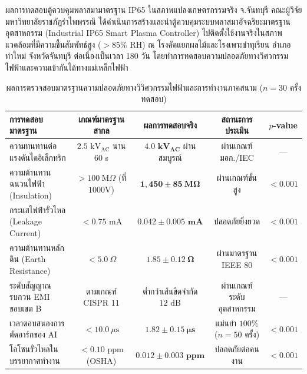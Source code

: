 \begin{agribox}{ผลการทดสอบตู้ควบคุมพลาสมามาตรฐาน IP65 ในสภาพแปลงเกษตรกรรมจริง จ.จันทบุรี}
คณะผู้วิจัย มหาวิทยาลัยราชภัฏรำไพพรรณี ได้ดำเนินการสร้างและนำตู้ควบคุมระบบพลาสมาอัจฉริยะมาตรฐานอุตสาหกรรม (Industrial IP65 Smart Plasma Controller) ไปติดตั้งใช้งานจริงในสภาพแวดล้อมที่มีความชื้นสัมพัทธ์สูง ($> 85\% \text{ RH}$) ณ โรงคัดแยกผลไม้และโรงเพาะชำทุเรียน อำเภอท่าใหม่ จังหวัดจันทบุรี ต่อเนื่องเป็นเวลา 180 วัน โดยทำการทดสอบความปลอดภัยทางวิศวกรรมไฟฟ้าและความเข้ากันได้ทางแม่เหล็กไฟฟ้า

\begin{table}[H]
\centering
\small
\caption{ผลการตรวจสอบมาตรฐานความปลอดภัยทางวิวิศวกรรมไฟฟ้าและการทำงานภาคสนาม ($n = 30$ ครั้งทดสอบ)}
\label{tab:ch10_electrical_safety}
\begin{tabular}{lcccc}
\toprule
\textbf{การทดสอบมาตรฐาน} & \textbf{เกณฑ์มาตรฐานสากล} & \textbf{ผลการทดสอบจริง} & \textbf{สถานะการประเมิน} & \textbf{$p$-value} \\
\midrule
ความทนทานต่อแรงดันไดอิเล็กทริก & $2.5 \text{ kV}_{\text{AC}}$ นาน 60 s & $\mathbf{4.0 \text{ kV}_{\text{AC}}}$ ผ่านสมบูรณ์ & ผ่านเกณฑ์ มอก./IEC & --- \\
ความต้านทานฉนวนไฟฟ้า (Insulation) & $> 100 \ \text{M}\Omega$ (ที่ $1000\text{V}$) & $\mathbf{1,450 \pm 85 \ \text{M}\Omega}$ & ผ่านเกณฑ์ขั้นสูง & $<0.001$ \\
กระแสไฟฟ้ารั่วไหล (Leakage Current) & $< 0.75 \text{ mA}$ & $\mathbf{0.042 \pm 0.005 \text{ mA}}$ & ปลอดภัยยิ่งยวด & $<0.001$ \\
ความต้านทานหลักดิน (Earth Resistance) & $< 5.0 \ \Omega$ & $\mathbf{1.85 \pm 0.12 \ \Omega}$ & ผ่านมาตรฐาน IEEE 80 & $<0.001$ \\
ระดับสัญญาณรบกวน EMI ขอบเขต B & ตามเกณฑ์ CISPR 11 & ต่ำกว่าเส้นขีดจำกัด $12 \text{ dB}$ & ผ่านเกณฑ์ระดับอุตสาหกรรม & --- \\
เวลาตอบสนองการตัดอาร์กของ AI & $< 10.0 \ \mu\text{s}$ & $\mathbf{1.82 \pm 0.15 \ \mu\text{s}}$ & แม่นยำ $100\%$ ($n=50$ ครั้ง) & $<0.001$ \\
โอโซนรั่วไหลในบรรยากาศทำงาน & $< 0.10 \text{ ppm}$ (OSHA) & $\mathbf{0.012 \pm 0.003 \text{ ppm}}$ & ปลอดภัยต่อคนงาน & $<0.001$ \\
\bottomrule
\end{tabular}
\end{table}


\end{agribox}
